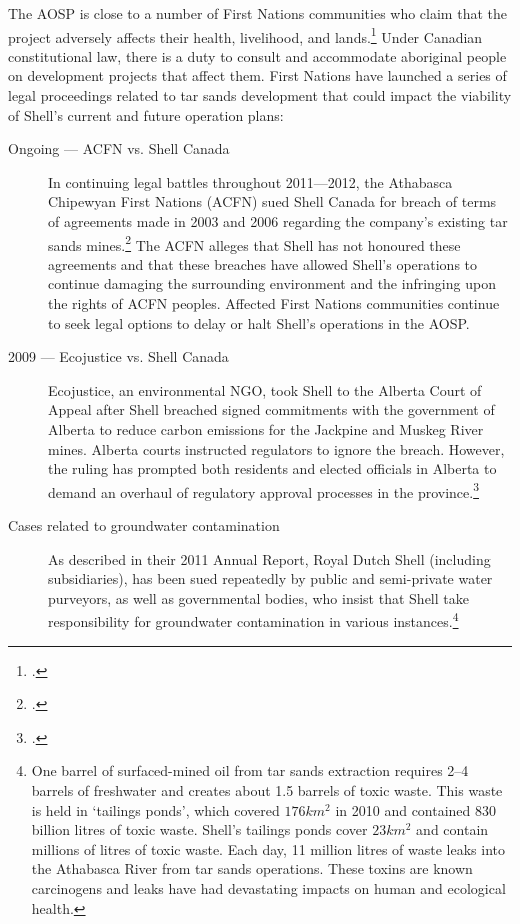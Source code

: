\documentclass[10pt]{article}
\begin{document}
The AOSP is close to a number of First Nations communities who claim that the project adversely affects their health, livelihood, and lands.\footcite[][]{RiskingRuin_2012}  
Under Canadian constitutional law, there is a duty to consult and accommodate aboriginal people on development projects that affect them.
First Nations have launched a series of legal proceedings related to tar sands development that could impact the viability of Shell's current and future operation plans:
\begin{description}
	\item [Ongoing --- ACFN vs. Shell Canada] In continuing legal battles throughout 2011---2012, the Athabasca Chipewyan First Nations (ACFN) sued Shell Canada for breach of terms of agreements made in 2003 and 2006 regarding the company's existing tar sands mines.\footcite{FNSues} The ACFN alleges that Shell has not honoured these agreements and that these breaches have allowed Shell's operations to continue damaging the surrounding environment and the infringing upon the rights of ACFN peoples. Affected First Nations communities continue to seek legal options to delay or halt Shell's operations in the AOSP.
	\item [2009 --- Ecojustice vs. Shell Canada] Ecojustice, an environmental NGO, took Shell to the Alberta Court of Appeal after Shell breached signed commitments with the government of Alberta to reduce carbon emissions for the Jackpine and Muskeg River mines. Alberta courts instructed regulators to ignore the breach. However, the ruling has prompted both residents and elected officials in Alberta to demand an overhaul of regulatory approval processes in the province.\footcite[][]{RiskingRuin_2012}
	\item [Cases related to groundwater contamination] As described in their 2011 Annual Report, Royal Dutch Shell (including subsidiaries), has been sued repeatedly by public and semi-private water purveyors, as well as governmental bodies, who insist that Shell take responsibility for groundwater contamination in various instances.\footnote{One barrel of surfaced-mined oil from tar sands extraction requires 2--4 barrels of freshwater and creates about 1.5 barrels of toxic waste. This waste is held in `tailings ponds', which covered $176 km^2$ in 2010 and contained 830 billion litres of toxic waste. Shell's tailings ponds cover $23 km^2$ and contain millions of litres of toxic waste. Each day, 11 million litres of waste leaks into the Athabasca River from tar sands operations. These toxins are known carcinogens and leaks have had devastating impacts on human and ecological health.} 

\end{description}
\end{document}
